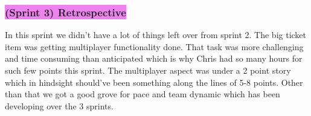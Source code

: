 \subsubsection{\colorbox{violet}{(Sprint 3) Retrospective}}
In this sprint we didn't have a lot of things left over from sprint 2. The big ticket item was getting multiplayer functionality done. That task was more challenging and time consuming than anticipated which is why Chris had so many hours for such few points this sprint. The multiplayer aspect was under a 2 point story which in hindsight should've been something along the lines of 5-8 points. Other than that we got a good grove for pace and team dynamic which has been developing over the 3 sprints.





